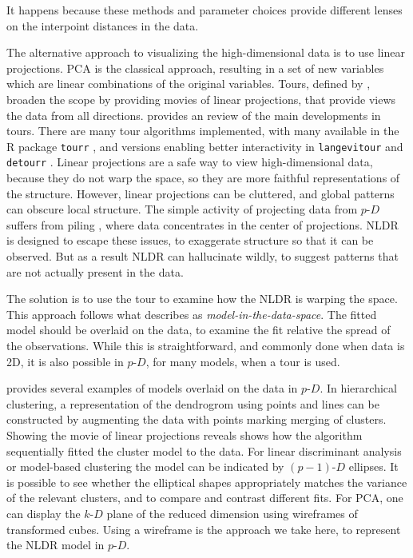 \documentclass[
  12pt]{article}
\newcommand\pD{$p\text{-}D$}
\newcommand\kD{$k\text{-}D$}
\begin{document}
It happens because these methods and parameter choices provide different
lenses on the interpoint distances in the data.

The alternative approach to visualizing the high-dimensional data is to
use linear projections. PCA is the classical approach, resulting in a
set of new variables which are linear combinations of the original
variables. Tours, defined by \citet{lee2021}, broaden the scope by
providing movies of linear projections, that provide views the data from
all directions. \citet{lee2021} provides an review of the main
developments in tours. There are many tour algorithms implemented, with
many available in the R package \texttt{tourr} \citep{wickham2011}, and
versions enabling better interactivity in \texttt{langevitour}
\citep{harisson2024} and \texttt{detourr} \citep{hart2022}. Linear
projections are a safe way to view high-dimensional data, because they
do not warp the space, so they are more faithful representations of the
structure. However, linear projections can be cluttered, and global
patterns can obscure local structure. The simple activity of projecting
data from \pD{} suffers from piling \citep{laa2022}, where data
concentrates in the center of projections. NLDR is designed to escape
these issues, to exaggerate structure so that it can be observed. But as
a result NLDR can hallucinate wildly, to suggest patterns that are not
actually present in the data.

The solution is to use the tour to examine how the NLDR is warping the
space. This approach follows what \citet{wickham2015} describes as
\emph{model-in-the-data-space}. The fitted model should be overlaid on
the data, to examine the fit relative the spread of the observations.
While this is straightforward, and commonly done when data is 2D, it is
also possible in \pD{}, for many models, when a tour is used.

\citet{wickham2015} provides several examples of models overlaid on the
data in \pD{}. In hierarchical clustering, a representation of the
dendrogrom using points and lines can be constructed by augmenting the
data with points marking merging of clusters. Showing the movie of
linear projections reveals shows how the algorithm sequentially fitted
the cluster model to the data. For linear discriminant analysis or
model-based clustering the model can be indicated by \((p-1)\text{-}D\)
ellipses. It is possible to see whether the elliptical shapes
appropriately matches the variance of the relevant clusters, and to
compare and contrast different fits. For PCA, one can display the \kD{}
plane of the reduced dimension using wireframes of transformed cubes.
Using a wireframe is the approach we take here, to represent the NLDR
model in \pD{}.
\end{document}
